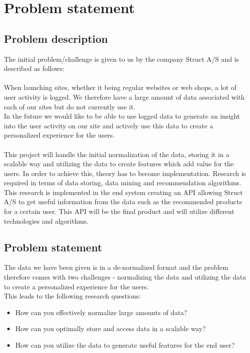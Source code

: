 
\chapter{Problem statement} %

\label{Chapter1} %


\section{Problem description}

The initial problem/challenge  is given to us by the company Struct A/S and is described as follows: \\\\
When launching sites, whether it being regular websites or web shops, a lot of user activity is logged. We therefore have a large amount of data associated with each of our sites but do not currently use it. \\
In the future we would like to be able to use logged data to generate an insight into the user activity on our site and actively use this data to create a personalized experience for the users. \\\\

This project will handle the initial normalization of the data, storing it in a scalable way and utilizing the data to create features which add value for the users. In order to achieve this, theory has to become implementation. Research is required in terms of data storing, data mining and recommendation algorithms. This research is implemented in the end system creating an API allowing Struct A/S to get useful information from the data such as the recommended products for a certain user. This API will be the final product and will utilize different technologies and algorithms.





\section{Problem statement}
The data we have been given is in a de-normalized format and the problem therefore comes with two challenges - normalizing the data and utilizing the data to create a personalized experience for the users. \\
This leads to the following research questions:
\begin{itemize}
\item How can you effectively normalize large amounts of data?
\item How can you optimally store and access data in a scalable way?
\item How can you utilize the data to generate useful features for the end user?
\end{itemize}
